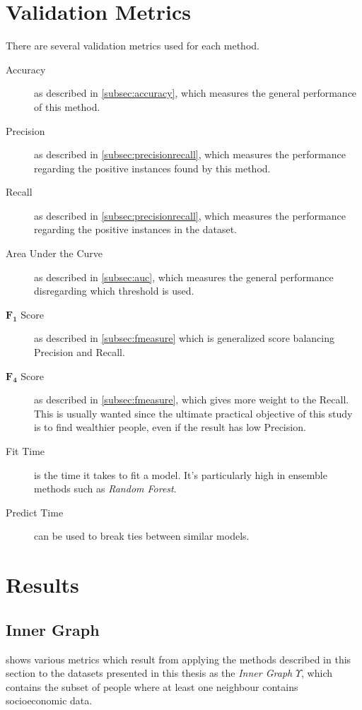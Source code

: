 \section{Validation Metrics}
\label{subsec:validationmetrics}
There are several validation metrics used for each method.

\begin{description}
	\item[Accuracy] as described in \cref{subsec:accuracy}, which measures the general performance of this method.
	\item[Precision] as described in \cref{subsec:precisionrecall}, which measures the performance regarding the positive instances found by this method.
	\item[Recall] as described in \cref{subsec:precisionrecall}, which measures the performance regarding the positive instances in the dataset.
	\item[Area Under the Curve] as described in \cref{subsec:auc}, which measures the general performance disregarding which threshold is used.
	\item[$\mathbf{F_1}$ Score] as described in \cref{subsec:fmeasure} which is generalized score balancing Precision and Recall.
	\item[$\mathbf{F_4}$ Score] as described in \cref{subsec:fmeasure}, which gives more weight to the Recall. This is usually wanted since the ultimate practical objective of this study is to find wealthier people, even if the result has low Precision.
	\item[Fit Time] is the time it takes to fit a model. It's particularly high in ensemble methods such as \emph{Random Forest}.
	\item[Predict Time] can be used to break ties between similar models.
\end{description}

\section{Results}
\label{sec:comparison_results}

\subsection{Inner Graph}
\label{subsec:comparison_inner_graph}

 shows various metrics which result from applying the methods described in this section to the datasets presented in this thesis as the \emph{Inner Graph} $\Upsilon$, which contains the subset of people where at least one neighbour contains socioeconomic data.

